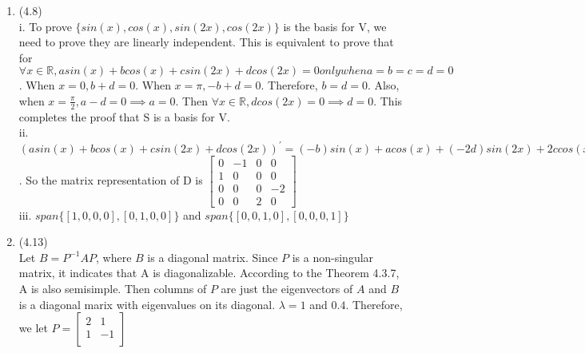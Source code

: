 \documentclass[letterpaper,12pt]{article}
\theoremstyle{definition}
\begin{document}
\begin{enumerate}
	\item(4.8)\\
	i. To prove $\{ sin(x), cos(x), sin(2x), cos(2x) \}$ is the basis for V, we need to prove they are linearly independent. This is equivalent to prove that for $\forall x \in \mathbb{R}, asin(x) + bcos(x) + csin(2x) + dcos(2x) = 0 only when a = b = c = d = 0 $. When $x=0, b + d = 0$. When $x = \pi, -b + d = 0$. Therefore, $b = d = 0$. Also, when $x = \frac{\pi}{2}, a-d = 0 \implies a = 0$. Then $\forall x \in \mathbb{R}, dcos(2x) = 0 \implies d = 0$. This completes the proof that S is a basis for V.\\
	ii. $(asin(x) +bcos(x) +csin(2x) +dcos(2x))^{'} = (-b)sin(x) + acos(x) +(-2d)sin(2x) + 2ccos(x)$. So the matrix representation of D is $\begin{bmatrix}
	   0 & -1 & 0 & 0 \\
	   1 & 0 & 0 & 0 \\
	   0 & 0 & 0 & -2 \\
	   0 & 0 & 2 & 0
	\end{bmatrix} $\\
	iii. $span\{ [1, 0, 0, 0], [0, 1, 0, 0] \}$ and $span\{ [0, 0, 1, 0], [0, 0, 0, 1]\}$\\

	\item(4.13)\\
	Let $B = P^{-1}AP$, where $B$ is a diagonal matrix. Since $P$ is a non-singular matrix, it indicates that A is diagonalizable. According to the Theorem 4.3.7, A is also semisimple. Then columns of  $P$ are just the eigenvectors of $A$ and $B$ is a diagonal marix with eigenvalues on its diagonal. $\lambda = 1$ and $0.4$. Therefore, we let $P = \begin{bmatrix}
	   2 &    1\\
	   1 & -1 \\
	\end{bmatrix}$\\


\end{enumerate}
\end{document}
